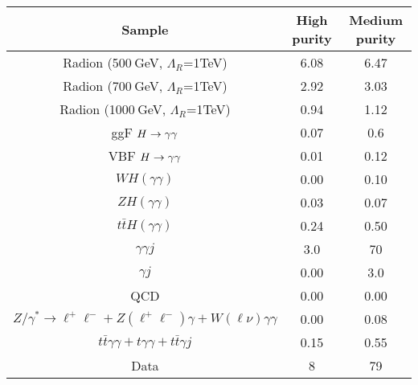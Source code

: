 \begin{tabular}{|c|c|c|}
\hline
Sample & High purity & Medium purity\\
\hline
Radion (500$~$GeV, $\Lambda_R$=1TeV)        &  6.08  & 6.47     \\
Radion (700$~$GeV, $\Lambda_R$=1TeV)        &  2.92  & 3.03     \\
Radion (1000$~$GeV, $\Lambda_R$=1TeV)       &  0.94  & 1.12     \\
\hline
ggF $H\to\gamma\gamma$                &  0.07  &  0.6  \\
VBF $H\to\gamma\gamma$                &  0.01  &  0.12 \\
$WH(\gamma\gamma)$        &  0.00  &  0.10 \\
$ZH(\gamma\gamma)$        &  0.03  &  0.07 \\
$t\bar{t}H(\gamma\gamma)$ &  0.24  &  0.50 \\
\hline
$\gamma\gamma j$                      & 3.0  &  70   \\
$\gamma j$                            & 0.00 &  3.0  \\
QCD                                   & 0.00 &  0.00 \\
$Z/\gamma^*\rightarrow\ell^+\ell^- + Z(\ell^+\ell^-)\gamma + W(\ell\nu)\gamma\gamma$ & 0.00 &  0.08 \\
$t\bar{t}\gamma\gamma + t\gamma\gamma + t\bar{t}\gamma j$ & 0.15 &  0.55 \\
\hline
Data                                  & 8 & 79 \\
\hline
\end{tabular}
